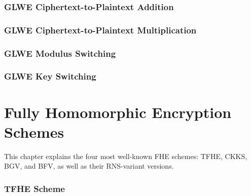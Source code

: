 \documentclass[11pt]{article}
\begin{document}
\clearpage

\section{GLWE Ciphertext-to-Plaintext Addition}
\label{sec:glwe-add-plain}


\clearpage

\section{GLWE Ciphertext-to-Plaintext Multiplication}
\label{sec:glwe-mult-plain}


\clearpage

\section{GLWE Modulus Switching}
\label{sec:modulus-switching}


\clearpage


\section{GLWE Key Switching}
\label{sec:glwe-key-switching}




\clearpage


%


\part{Fully Homomorphic Encryption Schemes}
\label{part:fhe-schemes}

\renewcommand{\thesection}{D-\arabic{section}}
\setcounter{section}{0}

This chapter explains the four most well-known FHE schemes: TFHE, CKKS, BGV, and BFV, as well as their RNS-variant versions. 

\newpage

\section{TFHE Scheme}
\label{sec:tfhe}

\end{document}
